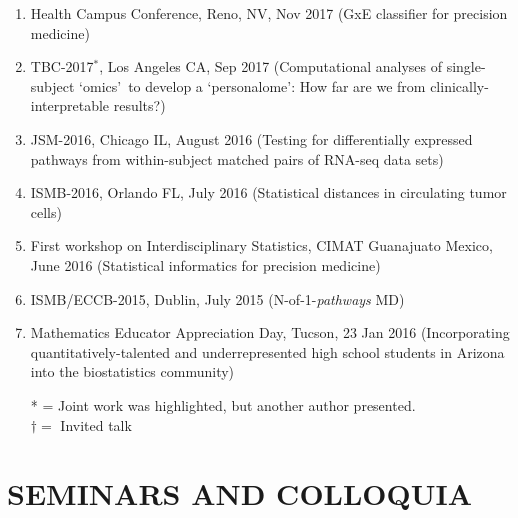 \documentclass[paper=a4,fontsize=11pt]{scrartcl} %
\newcommand{\NewPart}[2]{\section*{\uppercase{#1} #2 }}
\newcommand{\TalkEntry}[4]{
		\noindent #1, #2, #3 #4}
\begin{document}
\begin{enumerate}
\item\TalkEntry{Health Campus Conference}{Reno, NV}{Nov 2017}{(GxE classifier for precision medicine)}
  
  \item\TalkEntry{TBC-2017$^{*}$}{Los Angeles CA}{Sep 2017}{(Computational analyses of single-subject \lq omics\rq~to develop a \lq personalome\rq: How far are we from clinically-interpretable results?)}

\item\TalkEntry{JSM-2016}{Chicago IL}{August 2016}{(Testing for differentially expressed pathways from within-subject matched pairs of RNA-seq data sets)}
\item\TalkEntry{ISMB-2016}{Orlando FL}{July 2016}{(Statistical distances in circulating tumor cells)}
\item\TalkEntry{First workshop on Interdisciplinary Statistics}{CIMAT Guanajuato Mexico}{June 2016}{(Statistical informatics for precision medicine)} 
\item\TalkEntry{ISMB/ECCB-2015}{Dublin}{July 2015}{(N-of-1-\textit{pathways} MD)} 
\item\TalkEntry{2016 Mathematics Educator Appreciation Day}{Tucson}{23 Jan 2016}{(Incorporating quantitatively-talented and underrepresented high school students in Arizona into the biostatistics community)} 
\vspace{-7pt}

* = Joint work was highlighted, but another author presented.\\
$\dagger=$ Invited talk
\end{enumerate}

\NewPart{Seminars and Colloquia}{}
\end{document}
